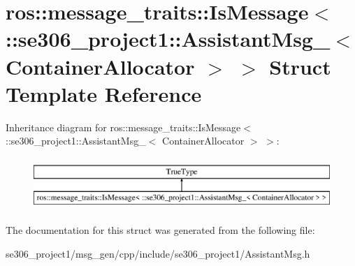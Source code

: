 \hypertarget{structros_1_1message__traits_1_1IsMessage_3_01_1_1se306__project1_1_1AssistantMsg___3_01ContainerAllocator_01_4_01_4}{\section{ros\-:\-:message\-\_\-traits\-:\-:Is\-Message$<$ \-:\-:se306\-\_\-project1\-:\-:Assistant\-Msg\-\_\-$<$ Container\-Allocator $>$ $>$ Struct Template Reference}
\label{structros_1_1message__traits_1_1IsMessage_3_01_1_1se306__project1_1_1AssistantMsg___3_01ContainerAllocator_01_4_01_4}
}
Inheritance diagram for ros\-:\-:message\-\_\-traits\-:\-:Is\-Message$<$ \-:\-:se306\-\_\-project1\-:\-:Assistant\-Msg\-\_\-$<$ Container\-Allocator $>$ $>$\-:\begin{figure}[H]
\begin{center}
\leavevmode
\includegraphics[height=2.000000cm]{structros_1_1message__traits_1_1IsMessage_3_01_1_1se306__project1_1_1AssistantMsg___3_01ContainerAllocator_01_4_01_4}
\end{center}
\end{figure}


The documentation for this struct was generated from the following file\-:\begin{DoxyCompactItemize}
\item 
se306\-\_\-project1/msg\-\_\-gen/cpp/include/se306\-\_\-project1/Assistant\-Msg.\-h\end{DoxyCompactItemize}
